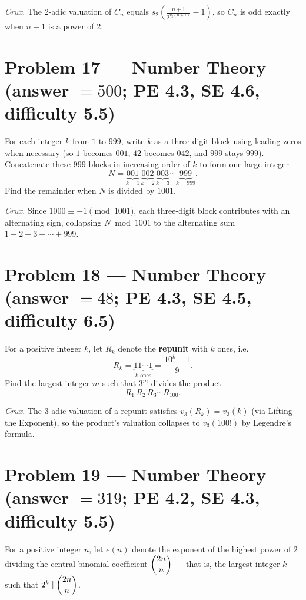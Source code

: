 \documentclass[11pt]{article}
\begin{document}
\medskip

\textit{Crux.} The 2-adic valuation of $C_n$ equals $s_2\!\left(\tfrac{n+1}{2^{v_2(n+1)}}-1\right)$, so $C_n$ is odd exactly when $n+1$ is a power of $2$.

\section*{Problem 17 --- Number Theory \quad (answer $=500$; PE 4.3, SE 4.6, difficulty 5.5)}

For each integer $k$ from $1$ to $999$, write $k$ as a three-digit block using leading zeros when necessary (so $1$ becomes $001$, $42$ becomes $042$, and $999$ stays $999$). Concatenate these $999$ blocks in increasing order of $k$ to form one large integer
$$N = \underbrace{001}_{k=1}\,\underbrace{002}_{k=2}\,\underbrace{003}_{k=3}\cdots\underbrace{999}_{k=999}.$$
Find the remainder when $N$ is divided by $1001$.

\medskip

\textit{Crux.} Since $1000 \equiv -1 \pmod{1001}$, each three-digit block contributes with an alternating sign, collapsing $N \bmod 1001$ to the alternating sum $1-2+3-\cdots+999$.

\section*{Problem 18 --- Number Theory \quad (answer $=48$; PE 4.3, SE 4.5, difficulty 6.5)}

For a positive integer $k$, let $R_k$ denote the \textbf{repunit} with $k$ ones, i.e.
$$R_k=\underbrace{11\cdots1}_{k\text{ ones}}=\frac{10^{k}-1}{9}.$$
Find the largest integer $m$ such that $3^{m}$ divides the product
$$R_1\,R_2\,R_3\cdots R_{100}.$$

\medskip

\textit{Crux.} The 3-adic valuation of a repunit satisfies $v_3(R_k)=v_3(k)$ (via Lifting the Exponent), so the product's valuation collapses to $v_3(100!)$ by Legendre's formula.

\section*{Problem 19 --- Number Theory \quad (answer $=319$; PE 4.2, SE 4.3, difficulty 5.5)}

For a positive integer $n$, let $e(n)$ denote the exponent of the highest power of $2$ dividing the central binomial coefficient $\dbinom{2n}{n}$ — that is, the largest integer $k$ such that $2^{k}\mid \dbinom{2n}{n}$.
\end{document}
